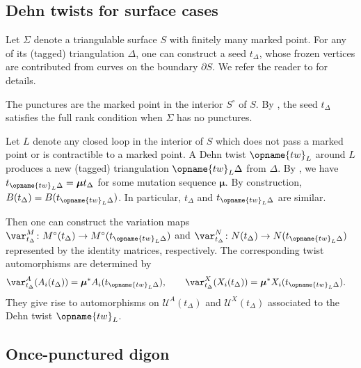 \documentclass[pdftex]{sigma}
\renewcommand{\tw}{\opname{tw}}
\newcommand{\Mc}{M^\circ}
\newcommand{\upClAlg}{\mathcal{U}^A}
\newcommand{\XClAlg}{\mathcal{U}^X}
\newcommand{\seq}{\boldsymbol{\mu}}%
\renewcommand{\tw}{\opname{tw}}
\numberwithin{equation}{section}
\begin{document}
\subsection{Dehn twists for surface cases}

Let $\Sigma$ denote a triangulable surface $S$ with finitely many
marked point. For any of its (tagged) triangulation $\Delta$, one
can construct a seed $t_{\Delta}$, whose frozen vertices are contributed
from curves on the boundary $\partial S$. We refer the reader to
\cite{FominShapiroThurston08,Muller12} for details.

The punctures are the marked point in the interior $S^{\circ}$ of
$S$. By \cite{Muller12}, the seed $t_{\Delta}$ satisfies the full
rank condition when $\Sigma$ has no punctures.

Let $L$ denote any closed loop in the interior of $S$ which does
not pass a marked point or is contractible to a marked point. A Dehn
twist $\tw_{L}$ around $L$ produces a new (tagged) triangulation
$\tw_{L}\Delta$ from $\Delta$. By \cite{FominShapiroThurston08},
we have $t_{\tw_{L}\Delta}=\seq t_{\Delta}$ for some mutation sequence
$\seq$. By construction, $B(t_{\Delta})=B(t_{\tw_{L}\Delta})$. In
particular, $t_{\Delta}$ and $t_{\tw_{L}\Delta}$ are similar.

Then one can construct the variation maps $\var_{t_{\Delta}}^{M}\colon\Mc(t_{\Delta})\rightarrow\Mc(t_{\tw_{L}\Delta})$
and $\var_{t_{\Delta}}^{N}\colon N(t_{\Delta})\rightarrow N(t_{\tw_{L}\Delta})$
represented by the identity matrices, respectively. The corresponding
twist automorphisms are determined by
\begin{align*}
\var_{t_{\Delta}}^{A}(A_{i}(t_{\Delta})) & =\seq^{*}A_{i}(t_{\tw_{L}\Delta}),\qquad
\var_{t_{\Delta}}^{X}(X_{i}(t_{\Delta})) =\seq^{*}X_{i}(t_{\tw_{L}\Delta}).
\end{align*}
They give rise to automorphisms on $\upClAlg(t_{\Delta})$ and $\XClAlg(t_{\Delta})$
associated to the Dehn twist $\tw_{L}$.

\subsection{Once-punctured digon}
\end{document}
